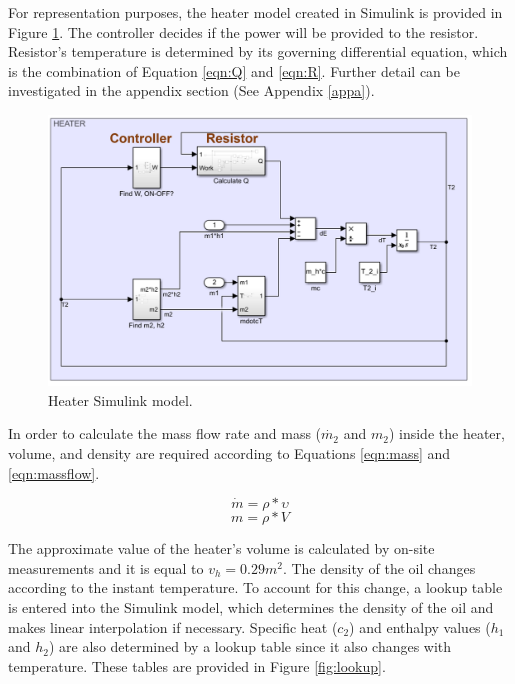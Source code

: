 \par
For representation purposes, the heater model created in Simulink is provided in Figure \ref{fig:heater}. The controller decides if the power will be provided to the resistor. Resistor's temperature is determined by its governing differential equation, which is the combination of Equation \ref{eqn:Q} and \ref{eqn:R}. Further detail can be investigated in the appendix section (See Appendix \ref{appa}).

\begin{figure}[h]
    \centering
    \includegraphics[width=12cm]{images/heater.png}
    \caption{Heater Simulink model.}
    \label{fig:heater}
\end{figure}

\par
In order to calculate the mass flow rate and mass ($\dot{m_{2}}$ and $m_{2}$) inside the heater, volume, and density are required according to Equations \ref{eqn:mass} and \ref{eqn:massflow}. 

\begin{equation}
    \label{eqn:massflow}
    \dot{m} = \rho * \upsilon
\end{equation}
\begin{equation}
    \label{eqn:mass}
    m= \rho * V
\end{equation}

\par
The approximate value of the heater's volume is calculated by on-site measurements and it is equal to $v_{h} = 0.29 m^2$. The density of the oil changes according to the instant temperature. To account for this change, a lookup table is entered into the Simulink model, which determines the density of the oil and makes linear interpolation if necessary. Specific heat ($c_{2}$) and enthalpy values ($h_{1}$ and $h_{2}$) are also determined by a lookup table since it also changes with temperature. These tables are provided in Figure \ref{fig:lookup}.

